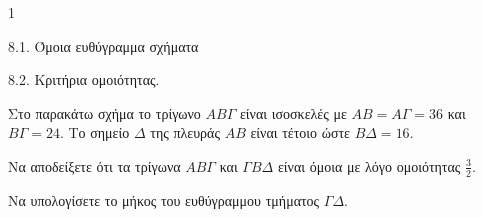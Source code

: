 \begin{ylh}{1}
    \item 8.1. Όμοια ευθύγραμμα σχήματα
    \item 8.2. Κριτήρια ομοιότητας.
\end{ylh}
\begin{figure} %
\centering
{}
\end{figure}
Στο παρακάτω σχήμα το τρίγωνο $AB\Gamma$ είναι ισοσκελές με $AB = A\Gamma = 36$ και $B\Gamma = 24$. Το σημείο $\Delta$ της πλευράς $AB$ είναι τέτοιο ώστε $B\Delta = 16$.
\begin{alist}
\item Να αποδείξετε ότι τα τρίγωνα $AB\Gamma$ και $\Gamma B\Delta$ είναι όμοια με λόγο ομοιότητας $\frac{3}{2}$. 
\item Να υπολογίσετε το μήκος του ευθύγραμμου τμήματος $\Gamma\Delta$. 
\end{alist}